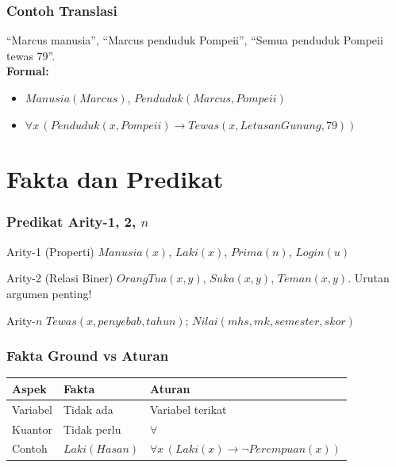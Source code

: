 \documentclass[handout]{beamer}
\theoremstyle{definition}
\theoremstyle{example}
\begin{document}
\begin{frame}
\frametitle{Contoh Translasi}
``Marcus manusia'', ``Marcus penduduk Pompeii'', ``Semua penduduk Pompeii tewas 79''.\\
\textbf{Formal:}
\begin{itemize}
  \item $Manusia(Marcus)$, $Penduduk(Marcus, Pompeii)$
  \item $\forall x\, (Penduduk(x, Pompeii) \rightarrow Tewas(x, LetusanGunung, 79))$
\end{itemize}
\end{frame}

\section{Fakta dan Predikat}

\begin{frame}
\frametitle{Predikat Arity-1, 2, $n$}
\begin{block}{Arity-1 (Properti)}
$Manusia(x)$, $Laki(x)$, $Prima(n)$, $Login(u)$
\end{block}
\begin{block}{Arity-2 (Relasi Biner)}
$OrangTua(x,y)$, $Suka(x,y)$, $Teman(x,y)$. Urutan argumen penting!
\end{block}
\begin{block}{Arity-$n$}
$Tewas(x, penyebab, tahun)$; $Nilai(mhs, mk, semester, skor)$
\end{block}
\end{frame}

\begin{frame}
\frametitle{Fakta Ground vs Aturan}
\begin{center}
\small
\begin{tabular}{|l|l|l|}
\hline
\textbf{Aspek} & \textbf{Fakta} & \textbf{Aturan} \\ \hline
Variabel & Tidak ada & Variabel terikat \\ \hline
Kuantor & Tidak perlu & $\forall$ \\ \hline
Contoh & $Laki(Hasan)$ & $\forall x\,(Laki(x) \rightarrow \neg Perempuan(x))$ \\ \hline
\end{tabular}
\end{center}
\end{frame}
\end{document}
